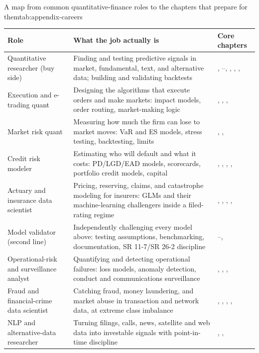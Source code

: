 \documentclass[../ai_in_finance]{subfiles}
\begin{document}
\begin{booktable}[htbp]{A map from common quantitative-finance roles to the chapters that prepare for them}{tab:appendix-careers}
\begin{tabular}{L{3.4cm}L{5.6cm}L{3.4cm}}
\toprule
Role & What the job actually is & Core chapters \\
\midrule
Quantitative researcher (buy side) & Finding and testing predictive signals in market, fundamental, text, and alternative data; building and validating backtests & , --, , , ,  \\
Execution and e-trading quant & Designing the algorithms that execute orders and make markets: impact models, order routing, market-making logic & , , ,  \\
Market risk quant & Measuring how much the firm can lose to market moves: VaR and ES models, stress testing, backtesting, limits & , ,  \\
Credit risk modeler & Estimating who will default and what it costs: PD/LGD/EAD models, scorecards, portfolio credit models, capital & , , , ,  \\
Actuary and insurance data scientist & Pricing, reserving, claims, and catastrophe modeling for insurers: GLMs and their machine-learning challengers inside a filed-rating regime & , , , ,  \\
Model validator (second line) & Independently challenging every model above: testing assumptions, benchmarking, documentation, SR 11-7/SR 26-2 discipline & --,  \\
Operational-risk and surveillance analyst & Quantifying and detecting operational failures: loss models, anomaly detection, conduct and communications surveillance & , , ,  \\
Fraud and financial-crime data scientist & Catching fraud, money laundering, and market abuse in transaction and network data, at extreme class imbalance & , , , ,  \\
NLP and alternative-data researcher & Turning filings, calls, news, satellite and web data into investable signals with point-in-time discipline & , ,  \\

\end{tabular}
\end{booktable}
\end{document}
